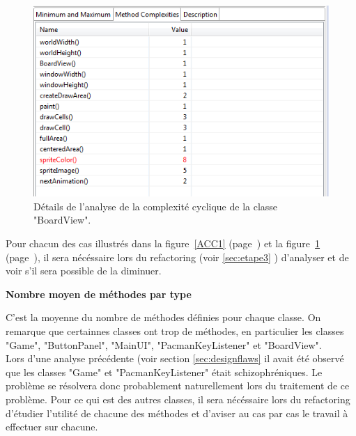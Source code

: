 \documentclass[12pt,a4paper,final]{article}
\newcommand{\smalltitle}[1]{\bigskip\large\textbf{#1}\par\normalsize\medskip}
\newcommand{\labelfigure}[1]{figure~\ref{#1} (page~\pageref{#1})}
\begin{document}
\begin{figure}[!h]
	\centering
	\includegraphics[width=\textwidth]{ACC_BoardView.png}
	\caption{\label{ACC2}Détails de l'analyse de la complexité cyclique de la classe "BoardView".}
\end{figure}
Pour chacun des cas illustrés dans la \labelfigure{ACC1} et la \labelfigure{ACC2}, il sera nécéssaire lors du refactoring (voir \ref{sec:etape3} ) d'analyser et de voir s'il sera possible de la diminuer.


\smalltitle{Nombre moyen de méthodes par type}
C'est la moyenne du nombre de méthodes définies pour chaque classe.
On remarque que certainnes classes ont trop de méthodes, en particulier les classes "Game", "ButtonPanel", "MainUI", "PacmanKeyListener" et "BoardView". \\
Lors d'une analyse précédente (voir section \ref{sec:designflaws} il avait été observé que les classes "Game" et "PacmanKeyListener" était schizophréniques. Le problème se résolvera donc probablement naturellement lors du traitement de ce problème. Pour ce qui est des autres classes, il sera nécéssaire lors du refactoring d'étudier l'utilité de chacune des méthodes et d'aviser au cas par cas le travail à effectuer sur chacune.

\clearpage
\end{document}
